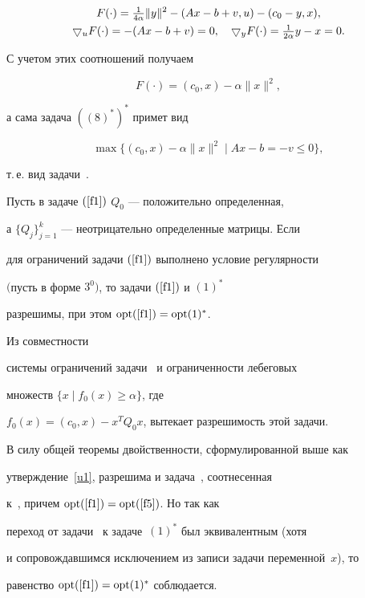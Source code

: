 \begin{pf}
\begin{gather*}
F(\cdot) = \tfrac{1}{4\alpha} \| y \|^2


-(Ax-b+v, u) -(c_0-y, x),\\


\btd_u F(\cdot ) = -(Ax-b+v) = 0,\quad


\btd_y F( \cdot ) = \tfrac{1}{2\alpha} y-x=0.


\end{gather*}


С учетом этих соотношений получаем


$$


F(\cdot) = (c_0, x) -\alpha \| x \|^2,


$$


а сама задача $((8)^*)^*$ примет вид


$$


\max \{ (c_0, x) -\alpha \| x \|^2 \mid Ax-b=-v\le 0\},


$$


т.\,е.{} вид задачи~.


\end{pf}





\begin{thm}\label{t1}


Пусть в задаче $\rf{f1}$\; $Q_0$ --- положительно определенная,


а $\{Q_j\}_{j=1}^k$ --- неотрицательно определенные матрицы. Если


для ограничений задачи $\rf{f1}$ выполнено условие регулярности


$($пусть в форме $3^0)$, то задачи $\rf{f1}$ и $(1)^*$


разрешимы, при этом $\opt\rf{f1} =\opt(1)^*$.


\end{thm}





\begin{pf}


Из совместности


системы ограничений задачи~ и ограниченности лебеговых


множеств $\{x \mid f_0(x)\ge \alpha \}$, где


$f_0(x) = (c_0,x) -x^T Q_0 x$, вытекает разрешимость этой задачи.


В силу общей теоремы двойственности, сформулированной выше как


утверждение~\ref{u1}, разрешима и задача~, соотнесенная


к~, причем $\opt \rf{f1} = \opt \rf{f5}$. Но так как


переход от задачи~ к задаче~$(1)^*$ был эквивалентным (хотя


и сопровождавшимся исключением из записи задачи переменной~$x$), то


равенство $\opt \rf{f1} = \opt (1)^*$ соблюдается.


\end{pf}





